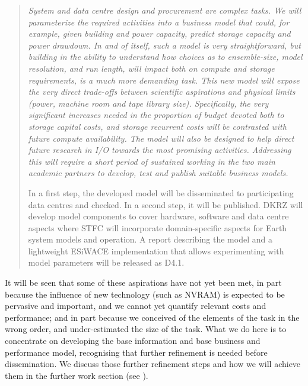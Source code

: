\documentclass{../../template/esiwace-report}
\begin{document}
\begin{quote}
	\itshape
	System and data centre design and procurement are complex tasks. We will
	parameterize the required activities into a business model that could, for
	example, given building and power capacity, predict storage capacity and power
	drawdown. In and of itself, such a model is very straightforward, but building
	in the ability to understand how choices as to ensemble-size, model resolution,
	and run length, will impact both on compute and storage requirements, is a much
	more demanding task. This new model will expose the very direct trade-offs between
	scientific aspirations and physical limits (power, machine room and tape
	library size).  Specifically, the very significant increases needed in the
	proportion of budget devoted both to storage capital costs, and storage
	recurrent costs will be contrasted with future compute availability. The model
	will also be designed to help direct future research in I/O towards the most
	promising activities. Addressing this will require a short period of sustained
	working in the two main academic partners to develop, test and publish suitable
	business models.

	In a first step, the developed model will be disseminated to participating data
	centres and checked.  In a second step, it will be published. DKRZ will develop
	model components to cover hardware, software and data centre aspects where STFC
	will incorporate domain-specific aspects for Earth system models and operation.
	A report describing the model and a lightweight ESiWACE implementation that
	allows experimenting with model parameters will be released as D4.1.
\end{quote}

It will be seen that some of these aspirations have not yet been met, in part because the influence of new technology (such as NVRAM) is expected to be pervasive and important, and we cannot yet quantify relevant costs and performance; and in part because we conceived of the elements of the task in the wrong order, and under-estimated the size of the task. What we do here is to concentrate on developing the base information and base business and performance model, recognising that further refinement is needed before dissemination. We discuss those further refinement steps and how we will achieve them in the further work section (see ).

\end{document}

